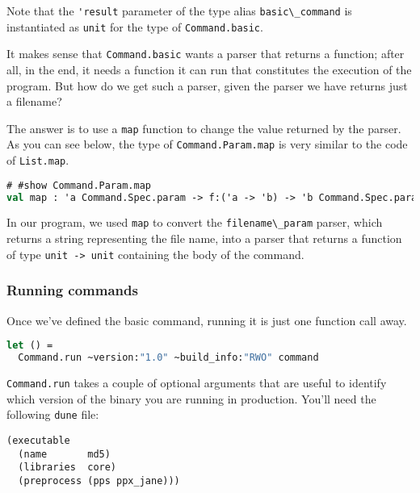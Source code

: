 Note that the \passthrough{\lstinline!'result!} parameter of the type
alias \passthrough{\lstinline!basic\_command!} is instantiated as
\passthrough{\lstinline!unit!} for the type of
\passthrough{\lstinline!Command.basic!}.

It makes sense that \passthrough{\lstinline!Command.basic!} wants a
parser that returns a function; after all, in the end, it needs a
function it can run that constitutes the execution of the program. But
how do we get such a parser, given the parser we have returns just a
filename?

The answer is to use a \passthrough{\lstinline!map!} function to change
the value returned by the parser. As you can see below, the type of
\passthrough{\lstinline!Command.Param.map!} is very similar to the code
of \passthrough{\lstinline!List.map!}.

\begin{lstlisting}[language=Caml]
# #show Command.Param.map
val map : 'a Command.Spec.param -> f:('a -> 'b) -> 'b Command.Spec.param
\end{lstlisting}

In our program, we used \passthrough{\lstinline!map!} to convert the
\passthrough{\lstinline!filename\_param!} parser, which returns a string
representing the file name, into a parser that returns a function of
type \passthrough{\lstinline!unit -> unit!} containing the body of the
command.

\hypertarget{running-basic-commands}{%
\subsubsection{Running commands}\label{running-basic-commands}}

Once we've defined the basic command, running it is just one function
call away.

\begin{lstlisting}[language=Caml]
let () =
  Command.run ~version:"1.0" ~build_info:"RWO" command
\end{lstlisting}

\passthrough{\lstinline!Command.run!} takes a couple of optional
arguments that are useful to identify which version of the binary you
are running in production. You'll need the following
\passthrough{\lstinline!dune!} file:

\begin{lstlisting}
(executable
  (name       md5)
  (libraries  core)
  (preprocess (pps ppx_jane)))
\end{lstlisting}

